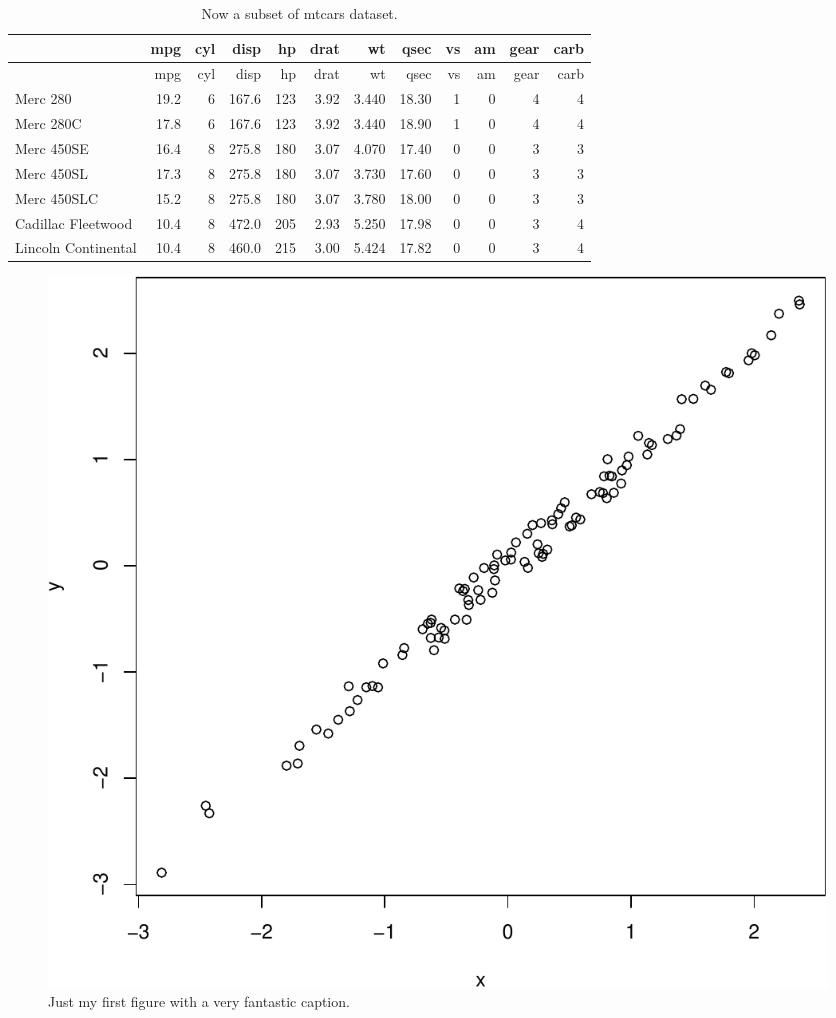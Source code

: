 \documentclass[11pt,a4paper]{article}
\begin{document}
\newpage

\begin{longtable}[]{@{}lrrrrrrrrrrr@{}}
\caption{Now a subset of mtcars dataset.}\tabularnewline
\toprule
& mpg & cyl & disp & hp & drat & wt & qsec & vs & am & gear &
carb\tabularnewline
\midrule
\endfirsthead
\toprule
& mpg & cyl & disp & hp & drat & wt & qsec & vs & am & gear &
carb\tabularnewline
\midrule
\endhead
Merc 280 & 19.2 & 6 & 167.6 & 123 & 3.92 & 3.440 & 18.30 & 1 & 0 & 4 &
4\tabularnewline
Merc 280C & 17.8 & 6 & 167.6 & 123 & 3.92 & 3.440 & 18.90 & 1 & 0 & 4 &
4\tabularnewline
Merc 450SE & 16.4 & 8 & 275.8 & 180 & 3.07 & 4.070 & 17.40 & 0 & 0 & 3 &
3\tabularnewline
Merc 450SL & 17.3 & 8 & 275.8 & 180 & 3.07 & 3.730 & 17.60 & 0 & 0 & 3 &
3\tabularnewline
Merc 450SLC & 15.2 & 8 & 275.8 & 180 & 3.07 & 3.780 & 18.00 & 0 & 0 & 3
& 3\tabularnewline
Cadillac Fleetwood & 10.4 & 8 & 472.0 & 205 & 2.93 & 5.250 & 17.98 & 0 &
0 & 3 & 4\tabularnewline
Lincoln Continental & 10.4 & 8 & 460.0 & 215 & 3.00 & 5.424 & 17.82 & 0
& 0 & 3 & 4\tabularnewline
\bottomrule
\end{longtable}

\clearpage

\listoffigures

\newpage

\begin{figure}
\centering
\includegraphics{output/figures/Fig1-1.pdf}
\caption{Just my first figure with a very fantastic caption.}
\end{figure}
\end{document}
